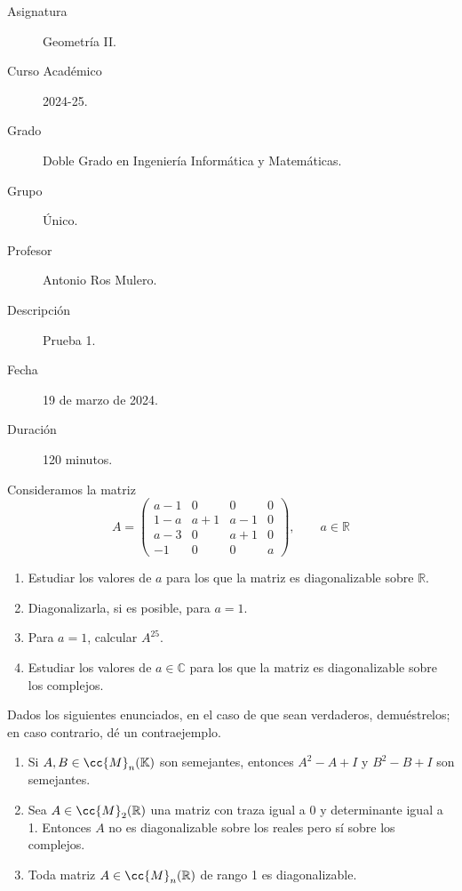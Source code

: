 \documentclass[12pt]{article}
\begin{document}
	
	
	
	
	
	\begin{description}
        \item[Asignatura] Geometría II.
		\item[Curso Académico] 2024-25.
		\item[Grado] Doble Grado en Ingeniería Informática y Matemáticas.
		\item[Grupo] Único.
		\item[Profesor] Antonio Ros Mulero.
		\item[Descripción] Prueba 1.
		\item[Fecha] 19 de marzo de 2024.
		\item[Duración] 120 minutos.
		
	\end{description}
	\newpage
	
	
	\begin{ejercicio}[5 puntos]
		Consideramos la matriz	
		$$	A= \begin{pmatrix} a-1 & 0 & 0 & 0 \\ 1-a & a+1 & a-1 & 0 \\
			a-3 & 0 & a+1 & 0 \\-1 & 0 & 0 & a
		\end{pmatrix},\qquad a \in \mathbb{R} $$
		
		\begin{enumerate}
			\item Estudiar los valores de $a$ para los que la matriz es diagonalizable sobre $\mathbb{R}$.
			\item Diagonalizarla, si es posible, para $a=1$.
			\item Para $a=1$, calcular $A^{25}$.
			\item Estudiar los valores de $a \in \mathbb{C}$ para los que la matriz es diagonalizable sobre los complejos.
		\end{enumerate}
	\end{ejercicio}
	
	\begin{ejercicio}[5 puntos]
		Dados los siguientes enunciados, en el caso de que sean verdaderos, demuéstrelos; en caso contrario, dé un contraejemplo.
		\begin{enumerate}
			\item Si $A, B \in \cc{M}_n(\mathbb{K})$ son semejantes, entonces $A^2 - A + I$ y $B^2 - B + I$ son semejantes.
			\item Sea $A \in \cc{M}_2(\mathbb{R})$ una matriz con traza igual a 0 y determinante igual a 1. Entonces $A$ no es diagonalizable sobre los reales pero sí sobre los complejos.
			\item Toda matriz $A \in \cc{M}_n(\mathbb{R})$ de rango 1 es diagonalizable.
		\end{enumerate}
	\end{ejercicio}	
	
\end{document}
